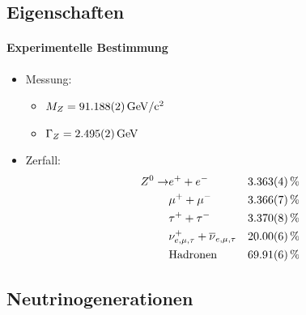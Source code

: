 \subsection{Eigenschaften}
\begin{iframe}
	\framesubtitle{Experimentelle Bestimmung}
	\begin{itemize}
		\item Messung: %
		\begin{itemize}
			\item $M_Z = \SI{91.188+-0.002}{GeV/c^2}$
			\item $\Gamma_Z = \SI{2.495+-0.002}{GeV}$
		\end{itemize}
		\pause
		\item Zerfall:
		\begin{align*}
			Z^0 \rightarrow & e^+ + e^- & \SI{3.363+-0.004}{\%} \\
			& \mu^+ + \mu^- & \SI{3.366+-0.007}{\%} \\
			& \tau^+ + \tau^- & \SI{3.370+-0.008}{\%} \\
			& \nu_{e,\mu,\tau}^+ + \overline{\nu}_{e,\mu,\tau} & \SI{20+-0.06}{\%} \\
			& \text{Hadronen} & \SI{69.91+-0.06}{\%} \\
		\end{align*}
	\end{itemize}
\note[item]{}
\end{iframe}

\subsection{Neutrinogenerationen}

